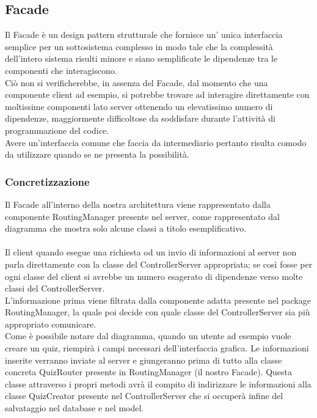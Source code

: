 \documentclass[a4paper, titlepage]{article}
\begin{document}
\subsection{Facade}
Il Facade è un design pattern strutturale che fornisce un’ unica interfaccia semplice per un sottosistema complesso in modo tale che la complessità dell'intero sistema risulti minore e siano semplificate le dipendenze tra le componenti che interagiscono.
\\ Ciò non si verificherebbe, in assenza del Facade, dal momento che una componente client ad esempio, si potrebbe trovare ad interagire direttamente con moltissime componenti lato server ottenendo un elevatissimo numero di dipendenze, maggiormente difficoltose da soddisfare durante l'attività di programmazione del codice.
\\ Avere un'interfaccia comune che faccia da intermediario pertanto risulta comodo da utilizzare quando se ne presenta la possibilità.

\subsubsection{Concretizzazione}
Il Facade all'interno della nostra architettura viene rappresentato dalla componente RoutingManager presente nel server, come rappresentato dal diagramma che mostra solo alcune classi a titolo esemplificativo.
\\
\\ Il client quando esegue una richiesta od un invio di informazioni al server non parla direttamente con la classe del ControllerServer appropriata; se così fosse per ogni classe del client si avrebbe un numero esagerato di dipendenze verso molte classi del ControllerServer.
\\L'informazione prima viene filtrata dalla componente adatta presente nel package RoutingManager, la quale poi decide con quale classe del ControllerServer sia più appropriato comunicare.
\\ Come è possibile notare dal diagramma, quando un utente ad esempio vuole creare un quiz, riempirà i campi necessari dell'interfaccia grafica. Le informazioni inserite verranno inviate al server e giungeranno prima di tutto alla classe concreta QuizRouter presente in RoutingManager (il nostro Facade). Questa classe attraverso i propri metodi avrà il compito di indirizzare le informazioni alla classe QuizCreator presente nel ControllerServer che si occuperà infine del salvataggio nel database e nel model.
\end{document}
